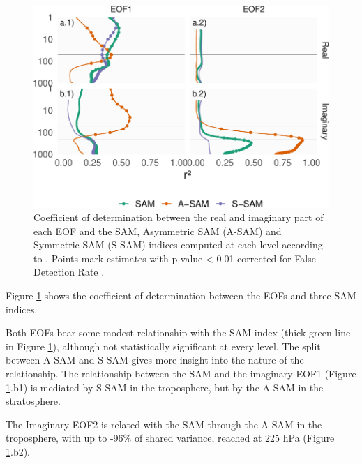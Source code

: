 \documentclass[smallextended]{svjour3}       %
\begin{document}
\begin{figure}
\centering
\includegraphics{../figures/sam-eof-vertical-1.pdf}
\caption{\label{fig:sam-eof-vertical}Coefficient of determination between the real and imaginary part of each EOF and the SAM, Asymmetric SAM (A-SAM) and Symmetric SAM (S-SAM) indices computed at each level according to \citet{campitelli2021}. Points mark estimates with p-value \textless{} 0.01 corrected for False Detection Rate \citep{benjamini1995}.}
\end{figure}

Figure \ref{fig:sam-eof-vertical} shows the coefficient of determination between the EOFs and three SAM indices.

Both EOFs bear some modest relationship with the SAM index (thick green line in Figure \ref{fig:sam-eof-vertical}), although not statistically significant at every level. The split between A-SAM and S-SAM gives more insight into the nature of the relationship. The relationship between the SAM and the imaginary EOF1 (Figure \ref{fig:sam-eof-vertical}.b1) is mediated by S-SAM in the troposphere, but by the A-SAM in the stratosphere.

The Imaginary EOF2 is related with the SAM through the A-SAM in the troposphere, with up to -96\% of shared variance, reached at 225 hPa (Figure \ref{fig:sam-eof-vertical}.b2).
\end{document}
